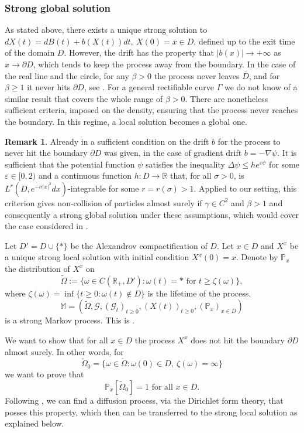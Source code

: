 \documentclass[11pt]{article}
\numberwithin{equation}{section}
\theoremstyle{definition}
\newtheorem{remark}[theorem]{Remark}
\begin{document}
\subsubsection{Strong global solution}
As stated above, there exists a unique strong solution to $dX(t)=dB(t)+b(X(t))dt,\  X(0)=x\in D$, defined up to the exit time of the  domain $D$. However, the drift has the property that $|b(x)| \to +\infty$ as $x\to\partial D$, which tends to keep the process away from the boundary. In the case of the real line and the circle, for any $\beta>0$ the process never leaves $\overline{D}$, and for $\beta\ge 1$ it never hits $\partial D$, see \cite{cepa1997diffusing, cepa2001brownian}. For a general rectifiable curve $\Gamma$ we do not know of a similar result that covers the whole range of $\beta>0$. There are nonetheless sufficient criteria, imposed on the density, ensuring that the process never reaches the boundary. In this regime, a local solution becomes a global one.

\begin{remark}
Already in \cite{krylov2005strong} a sufficient condition on the drift $b$ for the process to never hit the boundary $\partial D$ was given, in the case of gradient drift $b = - \nabla\psi$. It is sufficient that the potential function $\psi$ satisfies the inequality $\Delta\psi \le h e^{\varepsilon\psi}$ for some $\varepsilon\in [0,2)$ and a continuous function $h: D\to\mathbb{R}$ that, for all $\sigma>0$, is  $L^r(D, e^{-\sigma|x|^2}dx)$-integrable for some $r=r(\sigma)>1$. Applied to our setting, this criterion gives non-collision of particles almost surely if $\gamma\in C^{2}$ and $\beta>1$ and consequently a strong global solution under these assumptions, which would cover the case considered in \cite{zabrodin2023dyson}.
\end{remark}

Let $D'=D\cup\{*\}$ be the Alexandrov compactification of $D$. 
Let $x\in D$ and $X^{x}$ be a unique strong local solution with initial condition $X^{x}(0)=x$. Denote by $\mathbb{P}_{x}$ the distribution of $X^{x}$ on 
\[
    \tilde\Omega := \{\omega \in C(\mathbb{R}_{+}, D'): \omega(t) = * \text{ for } t\ge \zeta(\omega)\},
\]
where $\zeta(\omega) = \inf\{t\ge 0: \omega(t)\notin D\}$ is the lifetime of the process.
\[
    \mathbb{M} = (\tilde\Omega ,  \mathcal{G}, (\mathcal{G}_{t})_{t\ge 0},(X(t))_{t\ge 0},  (\mathbb{P}_{x})_{x\in D})
\]
is a strong Markov process. This is \cite[Theorems 2.1 and 2.5]{krylov2005strong}. 

We want to show that for all $x\in D$ the process $X^{x}$ does not hit the boundary $\partial D$ almost surely.  In other words, for
\[
    \tilde\Omega_{0} = \{\omega\in \tilde\Omega: \omega(0)\in D,\ \zeta(\omega)=\infty\}
\]
we want to prove that
\[
    \mathbb{P}_{x}[\tilde{\Omega}_{0}]=1 \text{ for all }x\in D.
\]
Following \cite[Section 4]{albeverio2003strong}, we can find a diffusion process, via the Dirichlet form theory, that posses this property, which then can be transferred to the strong local solution as explained below.
\end{document}

